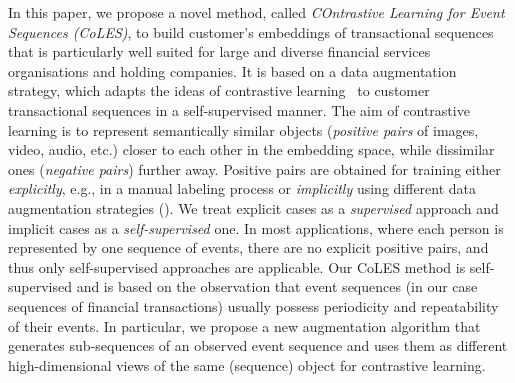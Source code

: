 \documentclass[sigconf, anonymous]{acmart}
\begin{document}


In this paper, we propose a novel method, called \emph{COntrastive Learning for Event Sequences (CoLES)}, to build customer's embeddings of transactional sequences that is particularly well suited for large and diverse financial services organisations and holding companies. It is based on a data augmentation strategy, which adapts the ideas of contrastive learning~\citep{Xing2002DistanceML, Hadsell2006DimensionalityRB} to customer transactional sequences in a self-supervised manner.
The aim of contrastive learning is to represent semantically similar objects (\textit{positive pairs} of images, video, audio, etc.) closer to each other in the embedding space, while dissimilar ones (\textit{negative pairs}) further away. Positive pairs are obtained for training either {\it explicitly}, e.g., in a manual labeling process or {\it implicitly} using different data augmentation strategies (\cite{Falcon2020AFF}). We treat explicit cases as a {\it supervised} approach and implicit cases as a {\it self-supervised} one. In most applications, where each person is represented by one sequence of events, there are no explicit positive pairs, and thus only self-supervised approaches are applicable. Our CoLES method is self-supervised and is based on the observation that event sequences (in our case sequences of financial transactions) usually possess periodicity and repeatability of their events. In particular, we propose
a new augmentation algorithm that generates sub-sequences of an observed event sequence and uses them as different high-dimensional 
views of the same (sequence) object for contrastive learning.
\end{document}

